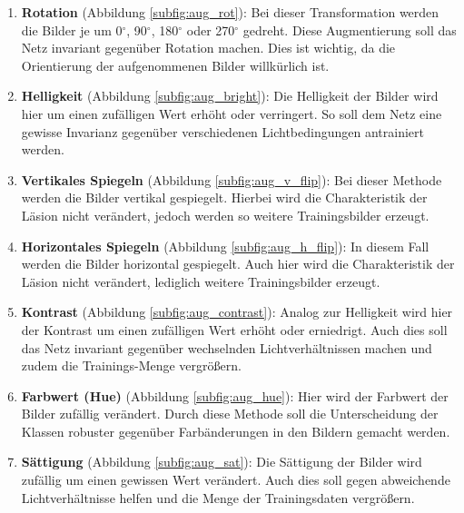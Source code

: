 \begin{enumerate}
    \item \textbf{Rotation} (Abbildung \ref{subfig:aug_rot}): Bei dieser Transformation werden die Bilder je um 0$^{\circ}$, 90$^{\circ}$, 180$^{\circ}$ oder 270$^{\circ}$ gedreht. Diese Augmentierung soll das Netz invariant gegenüber Rotation machen. Dies ist wichtig, da die Orientierung der aufgenommenen Bilder willkürlich ist.
    
    \item \textbf{Helligkeit} (Abbildung \ref{subfig:aug_bright}):  Die Helligkeit der Bilder wird hier um einen zufälligen Wert erhöht oder verringert. So soll dem Netz eine gewisse Invarianz gegenüber verschiedenen Lichtbedingungen antrainiert werden.
    
    \item \textbf{Vertikales Spiegeln} (Abbildung \ref{subfig:aug_v_flip}): Bei dieser Methode werden die Bilder vertikal gespiegelt. Hierbei wird die Charakteristik der Läsion nicht verändert, jedoch werden so weitere Trainingsbilder erzeugt. 
    
    \item \textbf{Horizontales Spiegeln} (Abbildung \ref{subfig:aug_h_flip}):  In diesem Fall werden die Bilder horizontal gespiegelt. Auch hier wird die Charakteristik der Läsion nicht verändert, lediglich weitere Trainingsbilder erzeugt.
    
    \item \textbf{Kontrast} (Abbildung \ref{subfig:aug_contrast}):  Analog zur Helligkeit wird hier der Kontrast um einen zufälligen Wert erhöht oder erniedrigt. Auch dies soll das Netz invariant gegenüber wechselnden Lichtverhältnissen machen und zudem die Trainings-Menge vergrößern.
    
    \item \textbf{Farbwert (Hue)} (Abbildung \ref{subfig:aug_hue}):  Hier wird der Farbwert der Bilder zufällig verändert. Durch diese Methode soll die Unterscheidung der Klassen robuster gegenüber Farbänderungen in den Bildern gemacht werden.
    
    \item \textbf{Sättigung} (Abbildung \ref{subfig:aug_sat}):  Die Sättigung der Bilder wird zufällig um einen gewissen Wert verändert. Auch dies soll gegen abweichende Lichtverhältnisse helfen und die Menge der Trainingsdaten vergrößern.
\end{enumerate}

